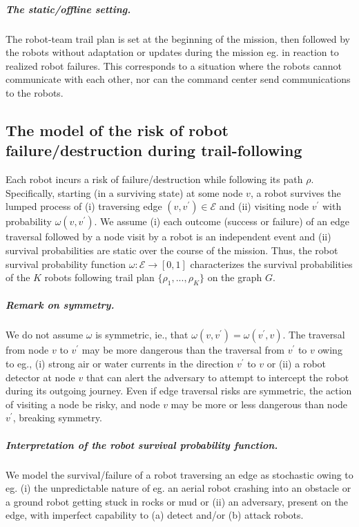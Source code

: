 \documentclass[11pt, oneside]{article}
\begin{document}
\subparagraph{The static/offline setting.} 
The robot-team trail plan is set at the beginning of the mission, then followed by the robots without adaptation or updates during the mission eg. in reaction to realized robot failures. 
This corresponds to a situation where the robots cannot communicate with each other, nor can the command center send communications to the robots. 

\subsection{The model of the risk of robot failure/destruction during trail-following} 
Each robot incurs a risk of failure/destruction while following its path $\rho$. 
Specifically, starting (in a surviving state) at some node $v$, a robot survives the lumped process of (i) traversing edge $(v, v^\prime) \in \mathcal{E}$ and (ii) visiting node $v^\prime$ with probability $\omega(v, v^\prime)$. 
We assume (i) each outcome (success or failure) of an edge traversal followed by a node visit by a robot is an independent event and (ii) survival probabilities are static over the course of the mission. 
Thus, the robot survival probability function $\omega: \mathcal{E} \rightarrow [0, 1]$ characterizes the survival probabilities of the $K$ robots following trail plan $\{\rho_1, ..., \rho_K\}$ on the graph $G$.%

\subparagraph{Remark on symmetry.} We do not assume $\omega$ is symmetric, ie., that $\omega(v, v^\prime) = \omega(v^\prime, v)$. The traversal from node $v$ to $v^\prime$ may be more dangerous than the traversal from $v^\prime$ to $v$ owing to eg., (i) strong air or water currents in the direction $v^\prime$ to $v$ or (ii) a robot detector at node $v$ that can alert the adversary to attempt to intercept the robot during its outgoing journey. Even if edge traversal risks are symmetric, the action of visiting a node be risky, and node $v$ may be more or less dangerous than node $v^\prime$, breaking symmetry. 

\subparagraph{Interpretation of the robot survival probability function.} We model the survival/failure of a robot traversing an edge as stochastic owing to eg. (i) the unpredictable nature of eg. an aerial robot crashing into an obstacle or a ground robot getting stuck in rocks or mud or (ii) an adversary, present on the edge, with imperfect capability to (a) detect and/or (b) attack robots.
\end{document}
